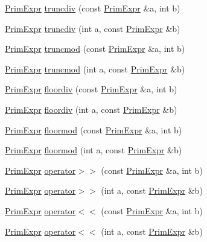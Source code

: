 \begin{DoxyCompactItemize}
\item 
\hyperlink{classtvm_1_1PrimExpr}{Prim\+Expr} \hyperlink{namespacetvm_ae50afd0565c00f594ee188bab7323372}{truncdiv} (const \hyperlink{classtvm_1_1PrimExpr}{Prim\+Expr} \&a, int b)
\item 
\hyperlink{classtvm_1_1PrimExpr}{Prim\+Expr} \hyperlink{namespacetvm_a5b5bb91649c681b0ea799689be9647bf}{truncdiv} (int a, const \hyperlink{classtvm_1_1PrimExpr}{Prim\+Expr} \&b)
\item 
\hyperlink{classtvm_1_1PrimExpr}{Prim\+Expr} \hyperlink{namespacetvm_a4c2633a4e92785dd73834bfff282699c}{truncmod} (const \hyperlink{classtvm_1_1PrimExpr}{Prim\+Expr} \&a, int b)
\item 
\hyperlink{classtvm_1_1PrimExpr}{Prim\+Expr} \hyperlink{namespacetvm_ad6c6dbf136b1086695780fd695df350b}{truncmod} (int a, const \hyperlink{classtvm_1_1PrimExpr}{Prim\+Expr} \&b)
\item 
\hyperlink{classtvm_1_1PrimExpr}{Prim\+Expr} \hyperlink{namespacetvm_a83e68dc71a05711a9c94123af2a3fdbf}{floordiv} (const \hyperlink{classtvm_1_1PrimExpr}{Prim\+Expr} \&a, int b)
\item 
\hyperlink{classtvm_1_1PrimExpr}{Prim\+Expr} \hyperlink{namespacetvm_ad3b659d13dd33e7a027b9d082315a776}{floordiv} (int a, const \hyperlink{classtvm_1_1PrimExpr}{Prim\+Expr} \&b)
\item 
\hyperlink{classtvm_1_1PrimExpr}{Prim\+Expr} \hyperlink{namespacetvm_a6993f628929a88cf563461c9dcafb2ae}{floormod} (const \hyperlink{classtvm_1_1PrimExpr}{Prim\+Expr} \&a, int b)
\item 
\hyperlink{classtvm_1_1PrimExpr}{Prim\+Expr} \hyperlink{namespacetvm_a08a5224a973dc893665ab543c116854d}{floormod} (int a, const \hyperlink{classtvm_1_1PrimExpr}{Prim\+Expr} \&b)
\item 
\hyperlink{classtvm_1_1PrimExpr}{Prim\+Expr} \hyperlink{namespacetvm_abccc3d3e96ee608022b148ffa05034eb}{operator$>$$>$} (const \hyperlink{classtvm_1_1PrimExpr}{Prim\+Expr} \&a, int b)
\item 
\hyperlink{classtvm_1_1PrimExpr}{Prim\+Expr} \hyperlink{namespacetvm_a550c2a251b2a6fd2a72172fe3db75d40}{operator$>$$>$} (int a, const \hyperlink{classtvm_1_1PrimExpr}{Prim\+Expr} \&b)
\item 
\hyperlink{classtvm_1_1PrimExpr}{Prim\+Expr} \hyperlink{namespacetvm_a9d8412e5f401f59f5ca85ed556d70810}{operator$<$$<$} (const \hyperlink{classtvm_1_1PrimExpr}{Prim\+Expr} \&a, int b)
\item 
\hyperlink{classtvm_1_1PrimExpr}{Prim\+Expr} \hyperlink{namespacetvm_ad0449d28f23318cc5163159a58c80ba3}{operator$<$$<$} (int a, const \hyperlink{classtvm_1_1PrimExpr}{Prim\+Expr} \&b)

\end{DoxyCompactItemize}
